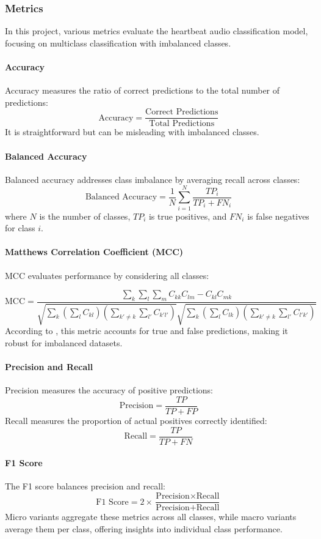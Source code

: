\subsubsection*{Metrics}

In this project, various metrics evaluate the heartbeat audio classification model, focusing on multiclass classification with imbalanced classes.

\paragraph{Accuracy}
Accuracy measures the ratio of correct predictions to the total number of predictions:
\[
    \text{Accuracy} = \frac{\text{Correct Predictions}}{\text{Total Predictions}}
\]
It is straightforward but can be misleading with imbalanced classes.

\paragraph{Balanced Accuracy}
Balanced accuracy addresses class imbalance by averaging recall across classes:
\[
    \text{Balanced Accuracy} = \frac{1}{N} \sum_{i=1}^{N} \frac{TP_i}{TP_i + FN_i}
\]
where \(N\) is the number of classes, \(TP_i\) is true positives, and \(FN_i\) is false negatives for class \(i\).

\paragraph{Matthews Correlation Coefficient (MCC)}
MCC evaluates performance by considering all classes:

\[
    \text{MCC} = \frac{\sum_k \sum_l \sum_m C_{kk} C_{lm} - C_{kl} C_{mk}}{\sqrt{\sum_k \left( \sum_l C_{kl} \right) \left( \sum_{k' \ne k} \sum_{l'} C_{k'l'} \right)} \sqrt{\sum_k \left( \sum_l C_{lk} \right) \left( \sum_{k' \ne k} \sum_{l'} C_{l'k'} \right)}}
\]
According to \citeauthor{Boughorbel2017Optimal} \cite{Boughorbel2017Optimal}, this metric accounts for true and false predictions, making it robust for imbalanced datasets.

\paragraph{Precision and Recall}
Precision measures the accuracy of positive predictions:
\[
    \text{Precision} = \frac{TP}{TP + FP}
\]
Recall measures the proportion of actual positives correctly identified:
\[
    \text{Recall} = \frac{TP}{TP + FN}
\]
\paragraph{F1 Score}
The F1 score balances precision and recall:
\[
    \text{F1 Score} = 2 \times \frac{\text{Precision} \times \text{Recall}}{\text{Precision} + \text{Recall}}
\]
Micro variants aggregate these metrics across all classes, while macro variants average them per class, 
offering insights into individual class performance.

